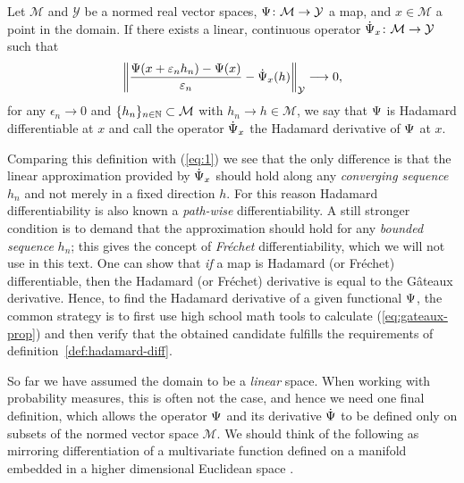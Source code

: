 \documentclass[a4,danish]{article}
\begin{document}
\begin{definition}
  \label{def:hadamard-diff}
  Let $\mathcal{M}$ and $\mathcal{Y}$ be a normed real vector spaces,
  $\operatorname{\Psi} \colon \mathcal{M} \rightarrow \mathcal{Y}$ a map, and $x \in \mathcal{M}$ a point in the
  domain. If there exists a linear, continuous operator
  $\dot{\operatorname{\Psi}}_x \colon \mathcal{M} \rightarrow \mathcal{Y} $ such that
  \begin{equation*}
    \left\Vert
      \frac{\operatorname{\Psi}(x + \varepsilon_n h_n) - \operatorname{\Psi}(x)}{\varepsilon_n} - \dot{\operatorname{\Psi}}_x(h)
    \right\Vert_{\mathcal{Y}} \longrightarrow 0,
  \end{equation*}
  for any $\epsilon_n \rightarrow 0$ and $\{h_n\}_{n \in \mathbb{N}} \subset \mathcal{M}$ with
  $h_n \rightarrow h \in \mathcal{M}$, we say that $\operatorname{\Psi}$ is Hadamard differentiable at $x$ and call
  the operator $\dot{\operatorname{\Psi}}_x$ the Hadamard derivative of $\operatorname{\Psi}$ at $x$.
\end{definition}

Comparing this definition with (\ref{eq:1}) we see that the only
difference is that the linear approximation provided by $\dot{\operatorname{\Psi}}_x$
should hold along any \textit{converging sequence} $h_n$ and not
merely in a fixed direction $h$. For this reason Hadamard
differentiability is also known a \textit{path-wise}
differentiability. A still stronger condition is to demand that the
approximation should hold for any \textit{bounded sequence} $h_n$;
this gives the concept of \textit{Fréchet} differentiability, which we 
will not use in this text. One can show that \textit{if} a map is
Hadamard (or Fréchet) differentiable, then the Hadamard (or Fréchet)
derivative is equal to the Gâteaux derivative. Hence, to find the
Hadamard derivative of a given functional $\operatorname{\Psi}$, the common strategy
is to first use high school math tools to calculate
(\ref{eq:gateaux-prop}) and then verify that the obtained candidate
fulfills the requirements of definition~\ref{def:hadamard-diff}.

So far we have assumed the domain to be a \textit{linear} space. When working with probability
measures, this is often not the case, and hence we need one final definition, which allows the
operator $\operatorname{\Psi}$ and its derivative $\dot{\operatorname{\Psi}}$ to be defined only on subsets of the normed vector
space $\mathcal{M}$. We should think of the following as mirroring differentiation of a multivariate
function defined on a manifold embedded in a higher dimensional Euclidean space .
\end{document}
